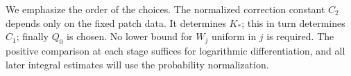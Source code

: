 We emphasize the order of the choices.  The normalized correction
constant \(C_2\) depends only on the fixed patch data.  It determines
\(K_*\); this in turn determines \(C_1\); finally \(Q_0\) is chosen.
No lower bound for \(W_j\) uniform in \(j\) is required.  The positive
comparison at each stage suffices for logarithmic differentiation,
and all later integral estimates will use the probability normalization.
